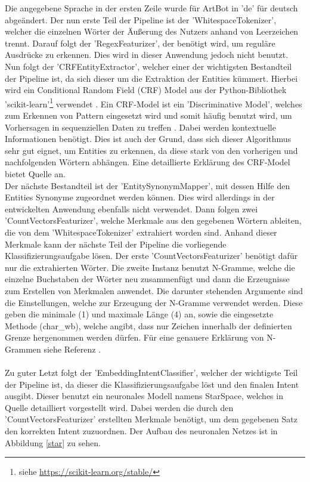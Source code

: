 Die angegebene Sprache in der ersten Zeile wurde für ArtBot in 'de' für deutsch abgeändert. Der nun erste Teil der Pipeline ist der 'WhitespaceTokenizer', welcher die einzelnen Wörter der Äußerung des Nutzers anhand von Leerzeichen trennt. Darauf folgt der 'RegexFeaturizer', der benötigt wird, um reguläre Ausdrücke zu erkennen. Dies wird in dieser Anwendung jedoch nicht benutzt. Nun folgt der 'CRFEntityExtractor', welcher einer der wichtigsten Bestandteil der Pipeline ist, da sich dieser um die Extraktion der Entities kümmert. Hierbei wird ein Conditional Random Field (CRF) Model aus der Python-Bibliothek 'scikit-learn'\footnote{siehe \href{https://scikit-learn.org/stable/}{https://scikit-learn.org/stable/}} verwendet \cite{nlunn}. Ein CRF-Model ist ein 'Discriminative Model', welches zum Erkennen von Pattern eingesetzt wird und somit häufig benutzt wird, um Vorhersagen in sequenziellen Daten zu treffen \cite{crf}. Dabei werden kontextuelle Informationen benötigt. Dies ist auch der Grund, dass sich dieser Algorithmus sehr gut eignet, um Entities zu erkennen, da diese stark von den vorherigen und nachfolgenden Wörtern abhängen. Eine detaillierte Erklärung des CRF-Model bietet Quelle \cite{crf} an.\\
Der nächste Bestandteil ist der 'EntitySynonymMapper', mit dessen Hilfe den Entities Synonyme zugeordnet werden können. Dies wird allerdings in der entwickelten Anwendung ebenfalls nicht verwendet. Dann folgen zwei 'CountVectorsFeaturizer', welche Merkmale aus den gegebenen Wörtern ableiten, die von dem 'WhitespaceTokenizer' extrahiert worden sind. Anhand dieser Merkmale kann der nächste Teil der Pipeline die vorliegende Klassifizierungsaufgabe lösen. Der erste 'CountVectorsFeaturizer' benötigt dafür nur die extrahierten Wörter. Die zweite Instanz benutzt N-Gramme, welche die einzelne Buchstaben der Wörter neu zusammenfügt und dann die Erzeugnisse zum Erstellen von Merkmalen anwendet. Die darunter stehenden Argumente sind die Einstellungen, welche zur Erzeugung der N-Gramme verwendet werden. Diese geben die minimale (1) und maximale Länge (4) an, sowie die eingesetzte Methode (char\_wb), welche angibt, dass nur Zeichen innerhalb der definierten Grenze hergenommen werden dürfen. Für eine genauere Erklärung von N-Grammen siehe Referenz \cite{ngramm}.\\
\\
Zu guter Letzt folgt der 'EmbeddingIntentClassifier', welcher der wichtigste Teil der Pipeline ist, da dieser die Klassifizierungsaufgabe löst und den finalen Intent ausgibt. Dieser benutzt ein neuronales Modell namens StarSpace, welches in Quelle \cite{starspace} detailliert vorgestellt wird. Dabei werden die durch den 'CountVectorsFeaturizer' erstellten Merkmale benötigt, um dem gegebenen Satz den korrekten Intent zuzuordnen. Der Aufbau des neuronalen Netzes ist in Abbildung \ref{star} zu sehen.
